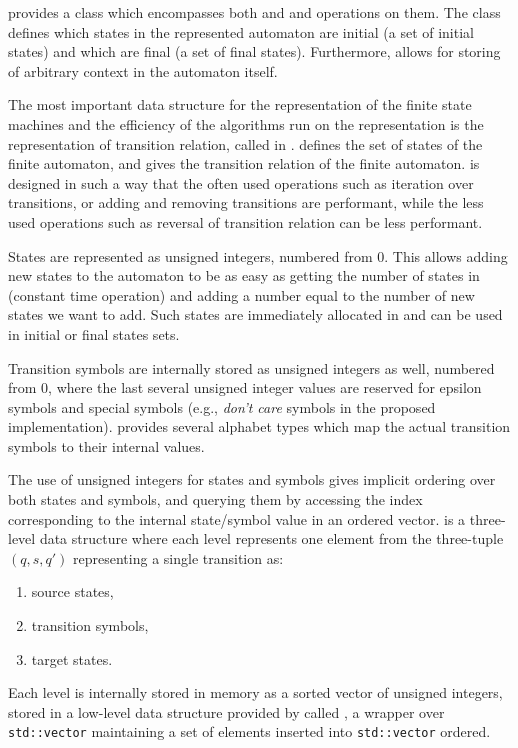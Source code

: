 \mata provides a class \nfaClass which encompasses both \nfas and \dfas and operations on them.
The class \nfaClass defines which states in the represented automaton are initial (a set of initial states) and which are final (a set of final states).
Furthermore, \nfaClass allows for storing of arbitrary context in the automaton itself.

The most important data structure for the representation of the finite state machines and the efficiency of the algorithms run on the representation is the representation of transition relation, called \deltastruct in \mata.
\deltastruct defines the set of states of the finite automaton, and gives the transition relation of the finite automaton.
\deltastruct is designed in such a way that the often used operations such as iteration over transitions, or adding and removing transitions are performant, while the less used operations such as reversal of transition relation can be less performant.

States are represented as unsigned integers, numbered from 0.
This allows adding new states to the automaton to be as easy as getting the number of states in \deltastruct (constant time operation) and adding a number equal to the number of new states we want to add.
Such states are immediately allocated in \deltastruct and can be used in initial or final states sets.

Transition symbols are internally stored as unsigned integers as well, numbered from 0, where the last several unsigned integer values are reserved for epsilon symbols and special symbols (e.g., \emph{don't care} symbols in the proposed \nfts implementation).
\mata provides several alphabet types which map the actual transition symbols to their internal values.

The use of unsigned integers for states and symbols gives implicit ordering over both states and symbols, and querying them by accessing the index corresponding to the internal state/symbol value in an ordered vector.
\deltastruct is a three-level data structure where each level represents one element from the three-tuple $(q, s, q')$ representing a single transition as:
\begin{enumerate}
    \item source states,
    \item transition symbols,
    \item target states.
\end{enumerate}

Each level is internally stored in memory as a sorted vector of unsigned integers, stored in a low-level data structure provided by \mata called \ordvector, a wrapper over \texttt{std::vector} maintaining a set of elements inserted into \texttt{std::vector} ordered.

